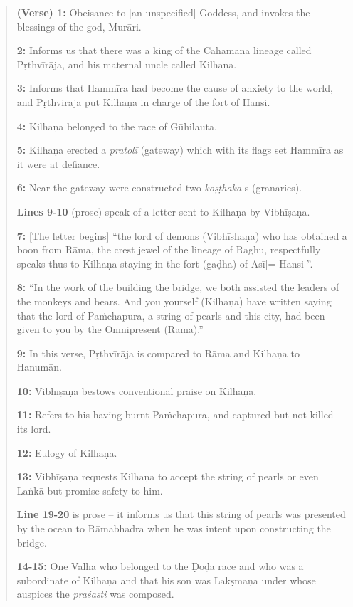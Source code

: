 \begin{quote}
{\bf (Verse) 1:} Obeisance to [an unspecified] Goddess, and invokes the blessings of the god, Murāri.

\smallskip
{\bf 2:} Informs us that there was a king of the Cāhamāna lineage called Pṛthvīrāja, and his maternal uncle called Kilhaṇa. 

\smallskip
{\bf 3:} Informs that Hammīra had become the cause of anxiety to the world, and Pṛthvirāja put Kilhaṇa in charge of the fort of Hansi. 

\smallskip
{\bf 4:} Kilhaṇa belonged to the race of Gūhilauta. 

\smallskip
{\bf 5:} Kilhaṇa erected a {\sl pratolī} (gateway) which with its flags set Hammīra as it were at defiance. 

\smallskip
{\bf 6:} Near the gateway were constructed two {\sl koṣṭhaka}-s (granaries).

\smallskip
{\bf Lines 9-10} (prose) speak of a letter sent to Kilhaṇa by Vibhīṣaṇa.

\smallskip
{\bf 7:} [The letter begins] ``the lord of demons (Vibhīshaṇa) who has obtained a boon from Rāma, the crest jewel of the lineage of Raghu, respectfully speaks thus to Kilhaṇa staying in the fort (gaḍha) of Āsī[= Hansi]”.  

\smallskip
{\bf 8:} “In the work of the building the bridge, we both assisted the leaders of the monkeys and bears. And you yourself (Kilhaṇa) have written saying that the lord of Paṁchapura, a string of pearls and this city, had been given to you by the Omnipresent (Rāma).”

\smallskip
{\bf 9:} In this verse, Pṛthvīrāja is compared to Rāma and Kilhaṇa to Hanumān. 

\smallskip
{\bf 10:} Vibhīṣaṇa bestows conventional praise on Kilhaṇa. 

\smallskip
{\bf 11:} Refers to his having burnt Paṁchapura, and captured but not killed its lord.

\smallskip
{\bf 12:} Eulogy of Kilhaṇa.

\smallskip
{\bf 13:} Vibhīṣaṇa requests Kilhaṇa to accept the string of pearls or even Laṅkā but promise safety to him.

\smallskip
{\bf Line 19-20} is prose – it informs us that this string of pearls was presented by the ocean to Rāmabhadra when he was intent upon constructing the bridge.

{\bf 14-15:} One Valha who belonged to the Ḍoḍa race and who was a subordinate of Kilhaṇa and that his son was Lakṣmaṇa under whose auspices the {\sl praśasti} was composed.
\end{quote}

